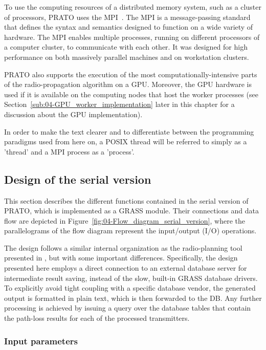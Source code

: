 To use the computing resources of a distributed memory system, such
as a cluster of processors, PRATO uses the MPI~\cite{Gropp_Using_MPI:1999}.
The MPI is a message-passing standard that defines the syntax and
semantics designed to function on a wide variety of hardware. The
MPI enables multiple processes, running on different processors of
a computer cluster, to communicate with each other. It was designed
for high performance on both massively parallel machines and on workstation
clusters.

PRATO also supports the execution of the most computationally-intensive
parts of the radio-propagation algorithm on a GPU. Moreover, the GPU
hardware is used if it is available on the computing nodes that host
the worker processes (see Section~\ref{sub:04-GPU_worker_implementation}
later in this chapter for a discussion about the GPU implementation).

In order to make the text clearer and to differentiate between the
programming paradigms used from here on, a POSIX thread will be referred
to simply as a 'thread' and a MPI process as a 'process'.


\subsection{Design of the serial version}

This section describes the different functions contained in the serial
version of PRATO, which is implemented as a GRASS module. Their connections
and data flow are depicted in Figure~\ref{fig:04-Flow_diagram_serial_version},
where the parallelograms of the flow diagram represent the input/output
(I/O) operations. 

The design follows a similar internal organization as the radio-planning
tool presented in \cite{Ozimek_Open.source.radio.coverage.prediction:2010},
but with some important differences. Specifically, the design presented
here employs a direct connection to an external database server for
intermediate result saving, instead of the slow, built-in GRASS database
drivers. To explicitly avoid tight coupling with a specific database
vendor, the generated output is formatted in plain text, which is
then forwarded to the DB. Any further processing is achieved by issuing
a query over the database tables that contain the path-loss results
for each of the processed transmitters.


\subsubsection{Input parameters}


